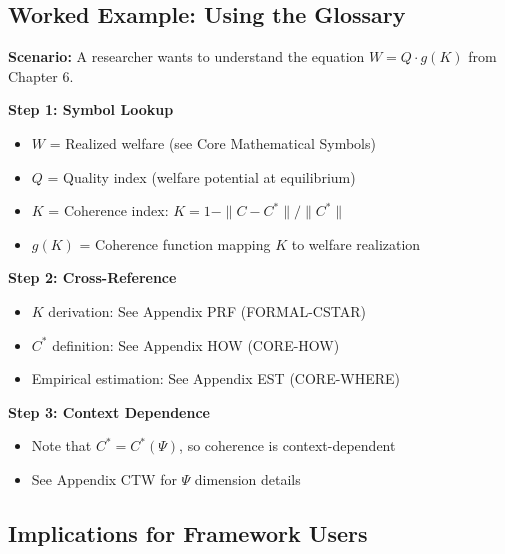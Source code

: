 
\subsection{Worked Example: Using the Glossary}
\label{sec:glossary-example}

\textbf{Scenario:} A researcher wants to understand the equation $W = Q \cdot g(K)$ from Chapter 6.

\textbf{Step 1: Symbol Lookup}
\begin{itemize}[nosep]
    \item $W$ = Realized welfare (see Core Mathematical Symbols)
    \item $Q$ = Quality index (welfare potential at equilibrium)
    \item $K$ = Coherence index: $K = 1 - \|C - C^*\|/\|C^*\|$
    \item $g(K)$ = Coherence function mapping $K$ to welfare realization
\end{itemize}

\textbf{Step 2: Cross-Reference}
\begin{itemize}[nosep]
    \item $K$ derivation: See Appendix PRF (FORMAL-CSTAR)
    \item $C^*$ definition: See Appendix HOW (CORE-HOW)
    \item Empirical estimation: See Appendix EST (CORE-WHERE)
\end{itemize}

\textbf{Step 3: Context Dependence}
\begin{itemize}[nosep]
    \item Note that $C^* = C^*(\Psi)$, so coherence is context-dependent
    \item See Appendix CTW for $\Psi$ dimension details
\end{itemize}

\subsection{Implications for Framework Users}
\label{sec:glossary-implications}


